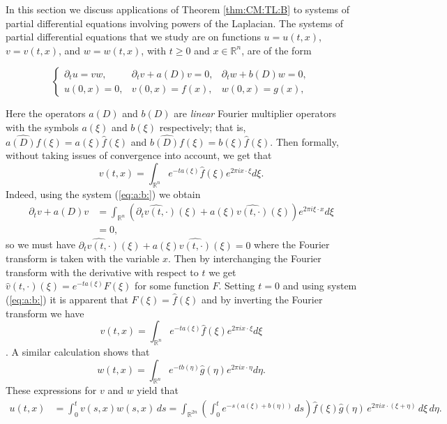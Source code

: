 \documentclass[10pt,a4paper]{article}
\theoremstyle{remark}
\newcommand{\re}{\mathbb{R}}
\newcommand{\rn}{{{\mathbb R}^n}}
\newcommand{\rtn}{\re^{2n}}
\newcommand{\eixxe}{e^{2\pi i x \cdot (\xi + \eta)}}
\newcommand{\dxi}{\, d\xi}
\newcommand{\deta}{\, d\eta}
\begin{document}
In this section we discuss applications of Theorem \ref{thm:CM:TL:B} to systems of partial differential equations involving powers of the Laplacian. The systems of partial differential equations that we study are on functions $u=u(t,x)$, $v=v(t,x)$, and $w=w(t,x)$, with $t\geq 0$ and $x\in\rn$, are of the form

\begin{equation} \label{eq:a:b:}
\left\{ \begin{array}{lll}  \partial_t u =vw, & \partial_t v +a(D) v = 0, & \partial_t w + b(D) w = 0, \\
  u(0,x)=0,&v(0,x)=f(x),&w(0,x) = g(x),
 \end{array} \right.
\end{equation}

Here the operators $a(D)$ and $b(D)$ are \textit{linear} Fourier multiplier operators with the symbols $a(\xi)$ and $b(\xi)$ respectively; that is, $\widehat{a(D)f}(\xi) = a(\xi)\widehat{f}(\xi)$ and $\widehat{b(D)f}(\xi) = b(\xi)\widehat{f}(\xi)$. Then formally, without taking issues of convergence into account, we get that 
\begin{equation}
v(t,x) = \int_\rn e^{-ta(\xi)} \widehat{f}(\xi)e^{2\pi i x\cdot \xi} d\xi.
\end{equation}
Indeed, using the system (\ref{eq:a:b:}) we obtain
\begin{align*}
\partial_t v +a(D) v &= \int_\rn (\widehat{\partial_t v(t,\cdot)}(\xi) + a(\xi)\widehat{v(t,\cdot)}(\xi))e^{2\pi i \xi \cdot x} d\xi \\
&=0,
\end{align*}
so we must have $\widehat{\partial_t v(t,\cdot)}(\xi) + a(\xi)\widehat{v(t,\cdot)}(\xi) = 0$ where the Fourier transform is taken with the variable $x$. Then by interchanging the Fourier transform with the derivative with respect to $t$ we get $\widehat{v}(t,\cdot)(\xi) = e^{-t a(\xi)} F(\xi)$ for some function $F$. Setting $t=0$ and using system (\ref{eq:a:b:}) it is apparent that $F(\xi) = \widehat{f}(\xi)$ and by inverting the Fourier transform we have $$v(t,x) = \int_\rn e^{-t a(\xi)} \widehat{f}(\xi) e^{2\pi i x\cdot \xi} d\xi$$. A similar calculation shows that $$w(t,x) = \int_\rn e^{-tb(\eta)} \widehat{g}(\eta) e^{2\pi i x\cdot \eta} d\eta.$$
These expressions for $v$ and $w$ yield that
\begin{align*}
u(t,x) & = \int_0^t v(s,x) w(s,x) \,ds  = \int_{\rtn} \left(\int_0^t e^{-s (a(\xi)+b(\eta))} \,ds \right) \widehat{f}(\xi) \widehat{g}(\eta) \, \eixxe \dxi\deta.
\end{align*}
\end{document}
